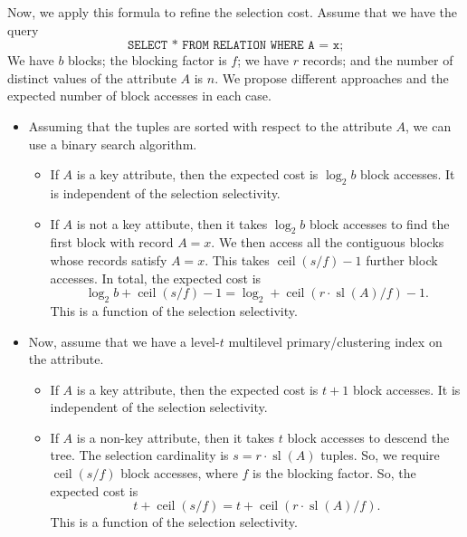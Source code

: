 \documentclass[a4paper, openany]{memoir}
\theoremstyle{definition}
\theoremstyle{plain}
\begin{document}
Now, we apply this formula to refine the selection cost. Assume that we have the query
\[\texttt{SELECT * FROM RELATION WHERE A = x;}\]
We have $b$ blocks; the blocking factor is $f$; we have $r$ records; and the number of distinct values of the attribute $A$ is $n$. We propose different approaches and the expected number of block accesses in each case.
\begin{itemize}
    \item Assuming that the tuples are sorted with respect to the attribute $A$, we can use a binary search algorithm. 
    \begin{itemize}
        \item If $A$ is a key attribute, then the expected cost is $\log_2 b$ block accesses. It is independent of the selection selectivity.
        \item If $A$ is not a key attibute, then it takes $\log_2 b$ block accesses to find the first block with record $A = x$. We then access all the contiguous blocks whose records satisfy $A = x$. This takes $\operatorname{ceil}(s/f) - 1$ further block accesses. In total, the expected cost is
        \[\log_2 b + \operatorname{ceil}(s/f) - 1 = \log_2 + \operatorname{ceil}(r \cdot \operatorname{sl}(A)/f) - 1.\]
        This is a function of the selection selectivity.
    \end{itemize}

    \item Now, assume that we have a level-$t$ multilevel primary/clustering index on the attribute.
    \begin{itemize}
        \item If $A$ is a key attribute, then the expected cost is $t + 1$ block accesses. It is independent of the selection selectivity.
        \item If $A$ is a non-key attribute, then it takes $t$ block accesses to descend the tree. The selection cardinality is $s = r \cdot \operatorname{sl}(A)$ tuples. So, we require $\operatorname{ceil}(s/f)$ block accesses, where $f$ is the blocking factor. So, the expected cost is
        \[t + \operatorname{ceil}(s/f) = t + \operatorname{ceil}(r \cdot \operatorname{sl}(A)/f).\]
        This is a function of the selection selectivity.
    \end{itemize}


\end{itemize}
\end{document}
